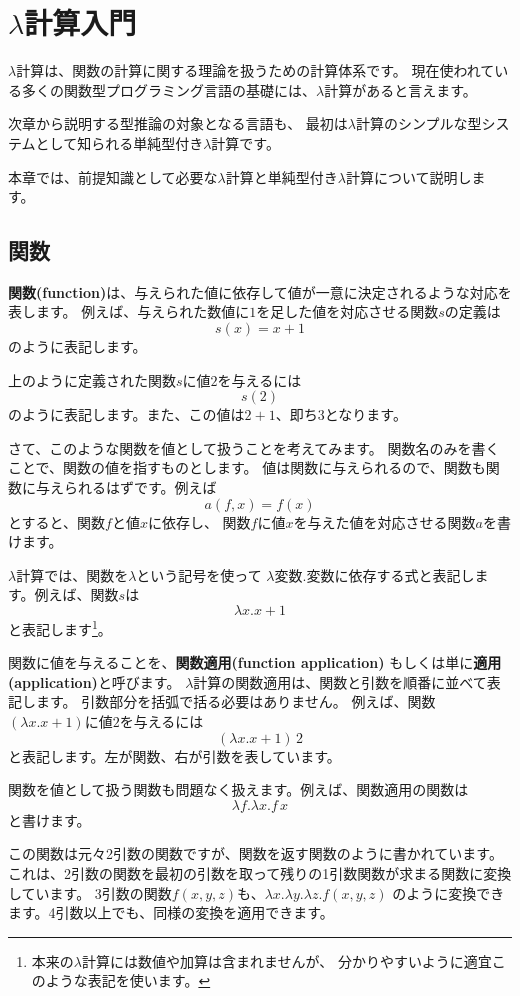 
\chapter{$\lambda$計算入門}

$\lambda$計算は、関数の計算に関する理論を扱うための計算体系です。
現在使われている多くの関数型プログラミング言語の基礎には、$\lambda$計算があると言えます。

次章から説明する型推論の対象となる言語も、
最初は$\lambda$計算のシンプルな型システムとして知られる単純型付き$\lambda$計算です。

本章では、前提知識として必要な$\lambda$計算と単純型付き$\lambda$計算について説明します。

\section{関数}

\textbf{関数(function)}は、与えられた値に依存して値が一意に決定されるような対応を表します。
例えば、与えられた数値に$1$を足した値を対応させる関数$s$の定義は
\[
  s(x) = x+1
\]
のように表記します。

上のように定義された関数$s$に値$2$を与えるには
\[
  s(2)
\]
のように表記します。また、この値は$2+1$、即ち$3$となります。

さて、このような関数を値として扱うことを考えてみます。
関数名のみを書くことで、関数の値を指すものとします。
値は関数に与えられるので、関数も関数に与えられるはずです。例えば
\[
  a(f, x) = f(x)
\]
とすると、関数$f$と値$x$に依存し、
関数$f$に値$x$を与えた値を対応させる関数$a$を書けます。

$\lambda$計算では、関数を$\lambda$という記号を使って
$\lambda \text{変数} . \text{変数に依存する式}$と表記します。例えば、関数$s$は
\[
  \lambda x . x + 1
\]
と表記します\footnote{本来の$\lambda$計算には数値や加算は含まれませんが、
分かりやすいように適宜このような表記を使います。}。

関数に値を与えることを、\textbf{関数適用(function application)}
もしくは単に\textbf{適用(application)}と呼びます。
$\lambda$計算の関数適用は、関数と引数を順番に並べて表記します。
引数部分を括弧で括る必要はありません。
例えば、関数$(\lambda x . x + 1)$に値$2$を与えるには
\[
  (\lambda x . x + 1) \, 2
\]
と表記します。左が関数、右が引数を表しています。

関数を値として扱う関数も問題なく扱えます。例えば、関数適用の関数は
\[
  \lambda f . \lambda x . f \, x
\]
と書けます。

この関数は元々2引数の関数ですが、関数を返す関数のように書かれています。
これは、2引数の関数を最初の引数を取って残りの1引数関数が求まる関数に変換しています。
3引数の関数$f(x, y, z)$も、$\lambda x . \lambda y . \lambda z . f(x, y, z)$
のように変換できます。4引数以上でも、同様の変換を適用できます。

